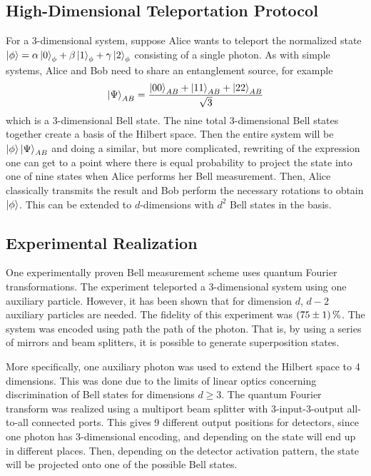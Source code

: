 \subsection{High-Dimensional Teleportation Protocol}
For a 3-dimensional system, suppose Alice wants to teleport the normalized state $\ket{\phi} = \alpha \ket{0}_\phi + \beta \ket{1}_\phi + \gamma \ket{2}_\phi$ consisting of a single photon. As with simple systems, Alice and Bob need to share an entanglement source, for example 
\begin{equation}
    \ket{\Psi}_{AB} = \frac{\ket{00}_{AB} + \ket{11}_{AB} + \ket{22}_{AB}}{\sqrt{3}}
\end{equation}
which is a 3-dimensional Bell state. The nine total 3-dimensional Bell states together create a basis of the Hilbert space. Then the entire system will be $\ket{\phi}\ket{\Psi}_{AB}$ and doing a similar, but more complicated, rewriting of the expression one can get to a point where there is equal probability to project the state into one of nine states when Alice performs her Bell measurement. Then, Alice classically transmits the result and Bob perform the necessary rotations to obtain $\ket{\phi}$. This can be extended to $d$-dimensions with $d^2$ Bell states in the basis. \cite{Luo:2019}

\subsection{Experimental Realization}
One experimentally proven Bell measurement scheme uses quantum Fourier transformations. The experiment teleported a 3-dimensional system using one auxiliary particle. However, it has been shown that for dimension $d$, $d-2$ auxiliary particles are needed. The fidelity of this experiment was $\SI{75\pm 1}{\percent}$. The system was encoded using path the path of the photon. That is, by using a series of mirrors and beam splitters, it is possible to generate superposition states. \cite{Luo:2019}

More specifically, one auxiliary photon was used to extend the Hilbert space to 4 dimensions. This was done due to the limits of linear optics concerning discrimination of Bell states for dimensions $d \geq 3$. The quantum Fourier transform was realized using a multiport beam splitter with 3-input-3-output all-to-all connected ports. This gives 9 different output positions for detectors, since one photon has 3-dimensional encoding, and depending on the state will end up in different places. Then, depending on the detector activation pattern, the state will be projected onto one of the possible Bell states. \cite{Luo:2019}